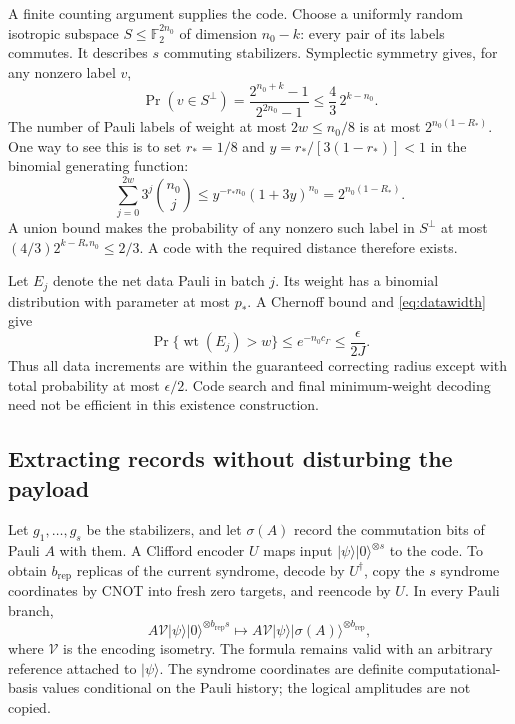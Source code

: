 \documentclass[11pt,a4paper]{article}
\numberwithin{equation}{section}
\theoremstyle{remark}\newtheorem*{remark}{Interpretation}
\newcommand{\wt}{\operatorname{wt}}
\newcommand{\F}{\mathbb F_2}
\newcommand{\eps}{\epsilon}
\newcommand{\ket}[1]{\lvert#1\rangle}
\begin{document}
A finite counting argument supplies the code. Choose a uniformly random isotropic subspace $S\le\F^{2n_0}$ of dimension $n_0-k$: every pair of its labels commutes. It describes $s$ commuting stabilizers. Symplectic symmetry gives, for any nonzero label $v$,
\begin{equation}
\Pr(v\in S^\perp)
=\frac{2^{n_0+k}-1}{2^{2n_0}-1}
\le\frac43\,2^{k-n_0}.
\end{equation}
The number of Pauli labels of weight at most $2w\le n_0/8$ is at most $2^{n_0(1-R_*)}$. One way to see this is to set $r_*=1/8$ and $y=r_*/[3(1-r_*)]<1$ in the binomial generating function:
\begin{equation}
\sum_{j=0}^{2w}3^j\binom{n_0}j
\le y^{-r_*n_0}(1+3y)^{n_0}
=2^{n_0(1-R_*)}.
\end{equation}
A union bound makes the probability of any nonzero such label in $S^\perp$ at most $(4/3)2^{k-R_*n_0}\le2/3$. A code with the required distance therefore exists.

Let $E_j$ denote the net data Pauli in batch $j$. Its weight has a binomial distribution with parameter at most $p_*$. A Chernoff bound and \eqref{eq:datawidth} give
\begin{equation}
\Pr\{\wt(E_j)>w\}\le e^{-n_0c_\Gamma}\le\frac\eps{2J}.
\end{equation}
Thus all data increments are within the guaranteed correcting radius except with total probability at most $\eps/2$. Code search and final minimum-weight decoding need not be efficient in this existence construction.

\subsection{Extracting records without disturbing the payload}
Let $g_1,\ldots,g_s$ be the stabilizers, and let $\sigma(A)$ record the commutation bits of Pauli $A$ with them. A Clifford encoder $U$ maps input $\ket\psi\ket0^{\otimes s}$ to the code. To obtain $b_{\mathrm{rep}}$ replicas of the current syndrome, decode by $U^\dagger$, copy the $s$ syndrome coordinates by CNOT into fresh zero targets, and reencode by $U$. In every Pauli branch,
\begin{equation}
A\mathcal V\ket\psi\ket0^{\otimes b_{\mathrm{rep}}s}
\longmapsto A\mathcal V\ket\psi\ket{\sigma(A)}^{\otimes b_{\mathrm{rep}}},
\end{equation}
where $\mathcal V$ is the encoding isometry. The formula remains valid with an arbitrary reference attached to $\ket\psi$. The syndrome coordinates are definite computational-basis values conditional on the Pauli history; the logical amplitudes are not copied.
\end{document}
